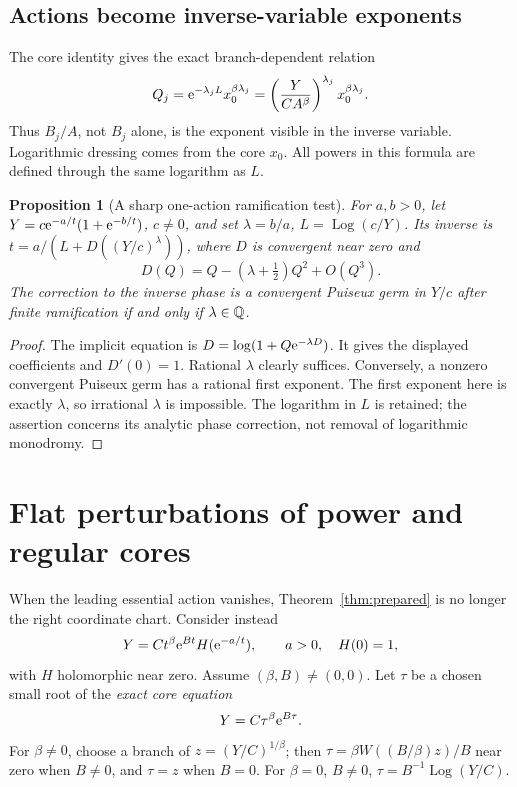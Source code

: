 \documentclass[11pt,a4paper]{article}
\numberwithin{equation}{section}
\newtheorem{proposition}[theorem]{Proposition}
\theoremstyle{definition}\newtheorem{definition}[theorem]{Definition}
\theoremstyle{remark}\newtheorem{remark}[theorem]{Remark}
\newcommand{\Log}{\operatorname{Log}}\newcommand{\Li}{\operatorname{Li}}
\begin{document}
\subsection{Actions become inverse-variable exponents}
The core identity gives the exact branch-dependent relation
\begin{equation}\label{eq:action-transport}
 Q_j=\mathrm e^{-\lambda_jL}x_0^{\beta\lambda_j}
 =\left(\frac{Y}{CA^\beta}\right)^{\lambda_j}
 x_0^{\beta\lambda_j}.
\end{equation}
Thus $B_j/A$, not $B_j$ alone, is the exponent visible in the inverse
variable. Logarithmic dressing comes from the core $x_0$.
All powers in this formula are defined through the same logarithm as $L$.

\begin{proposition}[A sharp one-action ramification test]\label{prop:irrational}
For $a,b>0$, let
$Y=c\mathrm e^{-a/t}(1+\mathrm e^{-b/t})$, $c\ne0$, and set
$\lambda=b/a$, $L=\Log(c/Y)$. Its inverse is
$t=a/(L+D((Y/c)^\lambda))$, where $D$ is convergent near zero and
\[
 D(Q)=Q-(\lambda+\tfrac12)Q^2+O(Q^3).
\]
The correction to the inverse phase is a convergent Puiseux germ in $Y/c$
after finite ramification if and only if $\lambda\in\mathbb Q$.
\end{proposition}
\begin{proof}
The implicit equation is $D=\log(1+Q\mathrm e^{-\lambda D})$.
It gives the displayed coefficients and $D'(0)=1$. Rational $\lambda$
clearly suffices. Conversely, a nonzero convergent Puiseux germ has a
rational first exponent. The first exponent here is exactly $\lambda$,
so irrational $\lambda$ is impossible. The logarithm in $L$ is retained;
the assertion concerns its analytic phase correction, not removal of
logarithmic monodromy.
\end{proof}

\section{Flat perturbations of power and regular cores}
\label{sec:power}
When the leading essential action vanishes, Theorem~\ref{thm:prepared}
is no longer the right coordinate chart. Consider instead
\begin{equation}\label{eq:power-map}
 Y=Ct^\beta\mathrm e^{Bt}H(\mathrm e^{-a/t}),\qquad a>0,\quad H(0)=1,
\end{equation}
with $H$ holomorphic near zero. Assume $(\beta,B)\ne(0,0)$.
Let $\tau$ be a chosen small root of the \emph{exact core equation}
\begin{equation}\label{eq:power-core}
 Y=C\tau^\beta\mathrm e^{B\tau}.
\end{equation}
For $\beta\ne0$, choose a branch of
$z=(Y/C)^{1/\beta}$; then
$\tau=\beta W((B/\beta)z)/B$ near zero when $B\ne0$, and
$\tau=z$ when $B=0$. For $\beta=0$, $B\ne0$,
$\tau=B^{-1}\Log(Y/C)$.
\end{document}
